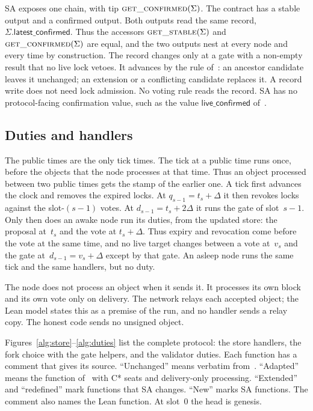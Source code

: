 \documentclass{article}
\theoremstyle{plain}
\theoremstyle{definition}
\theoremstyle{remark}
\newcommand{\latestConfirmed}{\mathsf{latest\_confirmed}}
\begin{document}
SA exposes one chain, with tip $\Call{get\_confirmed}{\Sigma}$.  The
contract has a stable output and a confirmed output.  Both outputs
read the same record, $\Sigma.\latestConfirmed$.  Thus the accessors
$\Call{get\_stable}{\Sigma}$ and $\Call{get\_confirmed}{\Sigma}$ are
equal, and the two outputs nest at every node and every time by
construction.  The record changes only at
a gate with a non-empty result that no live lock vetoes.  It advances
by the rule of~\cite{DC}: an ancestor candidate leaves it unchanged; an
extension or a conflicting candidate replaces it.  A record write does
not need lock admission.  No voting rule reads the record.  SA has no
protocol-facing confirmation value, such as the value
$\mathsf{live\_confirmed}$ of~\cite{DC}.

\subsection{Duties and handlers}\label{sec:public-handlers}

The public times are the only tick times.  The tick at a public time
runs once, before the objects that the node processes at that time.
Thus an object processed between two public times gets the stamp of the
earlier one.  A tick first advances the clock and removes the expired
locks.  At $q_{s-1}=t_s+\Delta$ it then revokes locks against the
slot-$(s-1)$ votes.  At $d_{s-1}=t_s+2\Delta$ it runs the gate of
slot~$s-1$.  Only then does an awake node run its duties, from the
updated store: the proposal at~$t_s$ and the vote at $t_s+\Delta$.
Thus expiry and revocation come before the vote at the same time, and no
live target changes between a vote at~$v_{s}$ and the gate
at~$d_{s-1}=v_s+\Delta$ except by that gate.  An asleep node runs the
same tick and the same handlers, but no duty.

The node does not process an object when it sends it.  It processes its
own block and its own vote only on delivery.  The network relays each
accepted object; the Lean model states this as a premise of the run,
and no handler sends a relay copy.  The honest code sends no unsigned
object.

Figures~\ref{alg:store}--\ref{alg:duties} list the complete protocol:
the store handlers, the fork choice with the gate helpers, and the
validator duties.  Each function has a comment that gives its source.
``Unchanged'' means verbatim from~\cite{DC}.  ``Adapted'' means the
function of~\cite{DC} with C* seats and delivery-only processing.
``Extended'' and ``redefined'' mark functions that SA changes.  ``New''
marks SA functions.  The comment also names the Lean function.  At
slot~$0$ the head is genesis.
\end{document}
